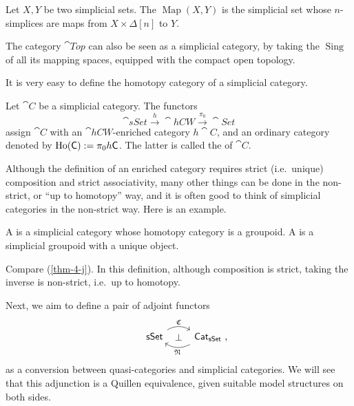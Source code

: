 \begin{definition}
    Let $X,Y$ be two simplicial sets.
    The  $\operatorname{Map}(X,Y)$
    is the simplicial set whose $n$-simplices are maps
    from $X\times\Delta[n]$ to $Y$.
\end{definition}

The category $\cat{Top}$ can also be seen as a simplicial category,
by taking the $\operatorname{Sing}$ of all its mapping spaces,
equipped with the compact open topology.

It is very easy to define the homotopy category of a simplicial category.

\begin{construction}
    Let $\cat C$ be a simplicial category. The functors
    \[ \cat{sSet}\xrightarrow{h}\cat{hCW}\xrightarrow{\pi_0}\cat{Set} \]
    assign $\cat C$ with an $\cat{hCW}$-enriched category $h\cat C$,
    and an ordinary category denoted by $\operatorname{Ho}(\mathsf{C}):=\pi_0h\mathsf{C}$.
    The latter is called the  of $\cat C$. \varqed
\end{construction}

Although the definition of an enriched category requires
strict (i.e.\ unique) composition and strict associativity,
many other things can be done in the non-strict, or ``up to homotopy'' way,
and it is often good to think of simplicial categories in the non-strict way.
Here is an example.

\begin{definition}
    A  is a simplicial category
    whose homotopy category is a groupoid.
    A  is a simplicial groupoid with a unique object.
\end{definition}

Compare (\ref{thm-4-j}).
In this definition, although composition is strict,
taking the inverse is non-strict, i.e.\ up to homotopy.

Next, we aim to define a pair of adjoint functors
\[\begin{tikzcd}
    \cat{sSet}\ar[r,bend left,"\mathfrak C"]\ar[r,phantom,"\bot"] &
    \rlap{$\cat{Cat}_{\cat{sSet}}$\ ,}\phantom{\cat{sSet}}\ar[l,bend left,"\mathfrak N"]
\end{tikzcd}\]
as a conversion between quasi-categories and simplicial categories.
We will see that this adjunction is a Quillen equivalence,
given suitable model structures on both sides.


